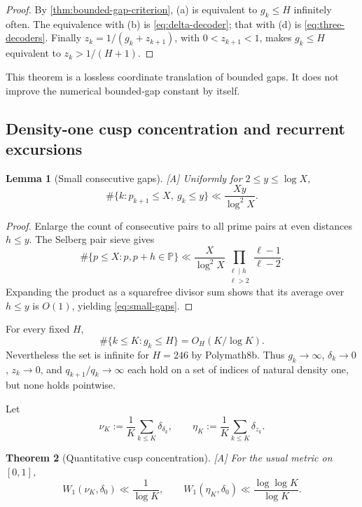 \documentclass[11pt]{article}
\newtheorem{theorem}{Theorem}[section]
\newtheorem{lemma}[theorem]{Lemma}
\theoremstyle{definition}
\theoremstyle{remark}
\newcommand{\PP}{\mathbb P}
\newcommand{\status}[1]{\textnormal{\textcolor{accent}{\footnotesize[#1]}}}
\begin{document}
\begin{proof}
By \cref{thm:bounded-gap-criterion}, (a) is equivalent to $g_k\le H$ infinitely often.
The equivalence with (b) is \eqref{eq:delta-decoder}; that with (d) is
\eqref{eq:three-decoders}.  Finally
$z_k=1/(g_k+z_{k+1})$, with $0<z_{k+1}<1$, makes $g_k\le H$ equivalent to
$z_k>1/(H+1)$.
\end{proof}

This theorem is a lossless coordinate translation of bounded gaps.  It does not improve
the numerical bounded-gap constant by itself.

\subsection{Density-one cusp concentration and recurrent excursions}

\begin{lemma}[Small consecutive gaps]\label{lem:small-gaps}
\status{A}
Uniformly for $2\le y\le\log X$,
\begin{equation}\label{eq:small-gaps}
 \#\{k:p_{k+1}\le X,\ g_k\le y\}
 \ll\frac{Xy}{\log^2X}.
\end{equation}
\end{lemma}

\begin{proof}
Enlarge the count of consecutive pairs to all prime pairs at even distances $h\le y$.
The Selberg pair sieve gives
\[
 \#\{p\le X:p,p+h\in\PP\}
 \ll \frac{X}{\log^2X}
 \prod_{\substack{\ell\mid h\\\ell>2}}\frac{\ell-1}{\ell-2}.
\]
Expanding the product as a squarefree divisor sum shows that its average over $h\le y$
is $O(1)$, yielding \eqref{eq:small-gaps}.
\end{proof}

For every fixed $H$,
\begin{equation}\label{eq:bounded-excursion-density}
 \#\{k\le K:g_k\le H\}=O_H(K/\log K).
\end{equation}
Nevertheless the set is infinite for $H=246$ by Polymath8b.  Thus
$g_k\to\infty$, $\delta_k\to0$, $z_k\to0$, and $q_{k+1}/q_k\to\infty$ each hold on
a set of indices of natural density one, but none holds pointwise.

Let
\[
 \nu_K:=\frac1K\sum_{k\le K}\delta_{\delta_k},
 \qquad
 \eta_K:=\frac1K\sum_{k\le K}\delta_{z_k}.
\]

\begin{theorem}[Quantitative cusp concentration]\label{thm:cusp-Wasserstein}
\status{A}
For the usual metric on $[0,1]$,
\begin{equation}\label{eq:cusp-Wasserstein}
 W_1(\nu_K,\delta_0)\ll\frac1{\log K},
 \qquad
 W_1(\eta_K,\delta_0)\ll\frac{\log\log K}{\log K}.
\end{equation}
\end{theorem}
\end{document}
